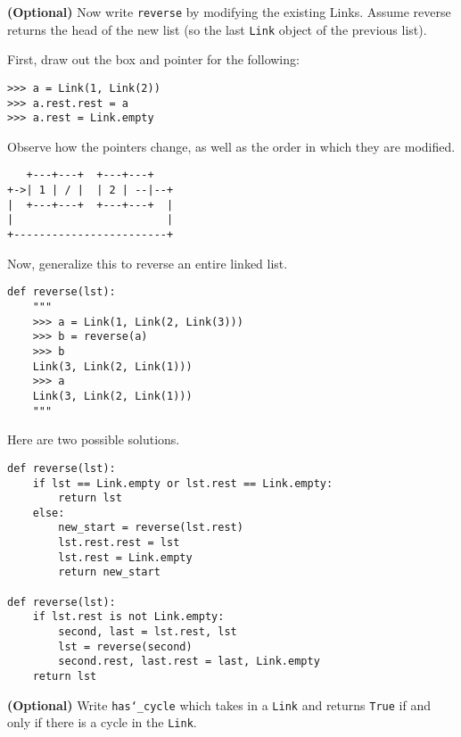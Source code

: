 \documentclass{exam}
\begin{document}
\begin{questions}
\begin{blocksection}
\end{blocksection}

\begin{blocksection}
\question \textbf{(Optional)} Now write \texttt{reverse} by modifying the existing Links. Assume reverse returns the head of the new list (so the last \texttt{Link} object of the previous list).

First, draw out the box and pointer for the following:
\begin{lstlisting}
>>> a = Link(1, Link(2))
>>> a.rest.rest = a
>>> a.rest = Link.empty
\end{lstlisting}
Observe how the pointers change, as well as the order in which they are
modified.
\begin{solution}[0.6in]
\begin{lstlisting}
   +---+---+  +---+---+
+->| 1 | / |  | 2 | --|--+
|  +---+---+  +---+---+  |
|                        |
+------------------------+
\end{lstlisting}
\end{solution}
\end{blocksection}

\begin{blocksection}
Now, generalize this to reverse an entire linked list.
\begin{lstlisting}
def reverse(lst):
    """
    >>> a = Link(1, Link(2, Link(3)))
    >>> b = reverse(a)
    >>> b
    Link(3, Link(2, Link(1)))
    >>> a
    Link(3, Link(2, Link(1)))
    """
\end{lstlisting}
\begin{solution}[1.25in]
Here are two possible solutions.
\begin{lstlisting}
def reverse(lst):
    if lst == Link.empty or lst.rest == Link.empty:
        return lst
    else:
        new_start = reverse(lst.rest)
        lst.rest.rest = lst
        lst.rest = Link.empty
        return new_start

def reverse(lst):
    if lst.rest is not Link.empty:
        second, last = lst.rest, lst
        lst = reverse(second)
        second.rest, last.rest = last, Link.empty
    return lst
\end{lstlisting}
\end{solution}


\end{blocksection}

\begin{blocksection}
\question \textbf{(Optional)} Write \texttt{has\char`_cycle} which takes in a
\texttt{Link} and returns \texttt{True} if and only if there is a cycle in the
\texttt{Link}.


\end{blocksection}
\end{questions}
\end{document}
